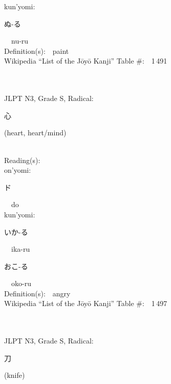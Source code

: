 \begin{multicols}{2}
{\hspace*{1em}}kun'yomi:\ \ \\
{\hspace*{2em}}{\begin{CJK}{UTF8}{min} ぬ-る \end{CJK}}\ \ nu-ru\ \ \\
Definition(s):\ \ paint \\
Wikipedia ``List of the J\=oy\=o Kanji'' Table \#:\ \ 1\,491 \\
\ \ \\
{\fontsize{34pt}{40pt}  }\ \ \\  %
{JLPT N3, Grade S, Radical:\ \ {\begin{CJK}{UTF8}{min} 心 \end{CJK}} (heart, heart/mind) } \\
Reading(s):\ \ \\
{\hspace*{1em}}on'yomi:\ \ \\
{\hspace*{2em}}{\begin{CJK}{UTF8}{min} ド \end{CJK}}\ \ do\ \ \\
{\hspace*{1em}}kun'yomi:\ \ \\
{\hspace*{2em}}{\begin{CJK}{UTF8}{min} いか-る \end{CJK}}\ \ ika-ru\ \ \\
{\hspace*{2em}}{\begin{CJK}{UTF8}{min} おこ-る \end{CJK}}\ \ oko-ru\ \ \\
Definition(s):\ \ angry \\
Wikipedia ``List of the J\=oy\=o Kanji'' Table \#:\ \ 1\,497 \\
\ \ \\
{\fontsize{34pt}{40pt}  }\ \ \\  %
{JLPT N3, Grade S, Radical:\ \ {\begin{CJK}{UTF8}{min} 刀 \end{CJK}} (knife) } \\

\end{multicols}
